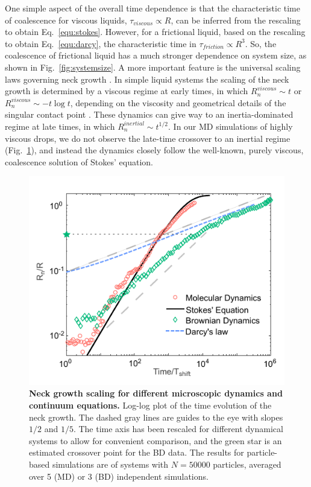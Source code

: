 \documentclass[%
reprint,
amsmath,amssymb,
aps,
]{revtex4-2}
\begin{document}
	One simple aspect of the overall time dependence is that the characteristic time of coalescence for viscous liquids, $\tau_{viscous}\propto R$, can be inferred from the rescaling to obtain Eq.~\ref{equ:stokes}. However, for a frictional liquid, based on the rescaling to obtain Eq.~\ref{equ:darcy}, the characteristic time in $\tau_{friction}\propto R^3$. So, the coalescence of frictional liquid has a much stronger dependence on system size, as shown in Fig.~\ref{fig:systemsize}. A more important feature is the universal scaling laws governing neck growth \cite{xia2019universality}. In simple liquid systems the scaling of the neck growth is determined by a viscous regime at early times, in which $R^{viscous}_n \sim t$ or $R^{viscous}_n \sim -t\log t$, depending on the viscosity and geometrical details of the singular contact point  \cite{paulsenInexorableResistanceInertia2012a,anthony2020coalescence}. These dynamics can give way to an inertia-dominated regime at late times, in which $R_n^{inertial} \sim t^{1/2}$. In our MD simulations of highly viscous drops, we do not observe the late-time crossover to an inertial regime (Fig.~\ref{fig:scaling}), and instead the dynamics closely follow the well-known, purely viscous, coalescence solution of Stokes' equation.
	
	\begin{figure}[htb]
		\centering
		\includegraphics[width=\columnwidth]{Figure3.pdf}
		\caption{\textbf{Neck growth scaling for different microscopic dynamics and continuum equations.} Log-log plot of the time evolution of the neck growth. The dashed gray lines are guides to the eye with slopes $1/2$ and $1/5$. The time axis has been rescaled for different dynamical systems to allow for convenient comparison, and the green star is an estimated crossover point for the BD data. The results for particle-based simulations are of systems with $N=50000$ particles, averaged over 5 (MD) or 3 (BD) independent simulations.}
		\label{fig:scaling}
	\end{figure}
	
\end{document}
